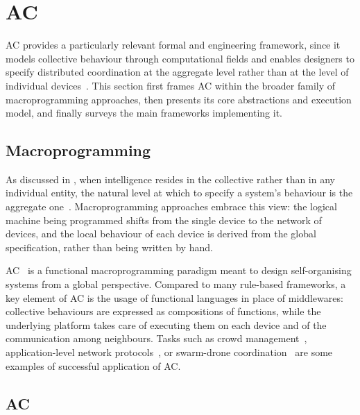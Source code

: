 \section{\acl{AC}}
\label{sec:ac}

\ac{AC} provides a particularly relevant formal and engineering framework,
since it models collective behaviour through computational fields 
and enables designers to specify distributed coordination 
at the aggregate level rather than at the level of individual devices~\cite{viroli2019jlap}.
%
This section first frames \ac{AC} within the broader family of macroprogramming approaches,
then presents its core abstractions and execution model,
and finally surveys the main frameworks implementing it.

\subsection{Macroprogramming}
\label{subsec:macroprogramming}

As discussed in ,
when intelligence resides in the collective rather than in any individual entity,
the natural level at which to specify a system's behaviour is the aggregate one~\cite{DBLP:conf/saso/CasadeiV18}.
%
Macroprogramming approaches embrace this view:
the logical machine being programmed shifts
from the single device to the network of devices,
and the local behaviour of each device is derived from the global specification,
rather than being written by hand.

\ac{AC}~\cite{BealIEEEComputer2015} is a functional macroprogramming paradigm
meant to design self-organising systems from a global perspective.
%
Compared to many rule-based frameworks,
a key element of \ac{AC} is the usage of functional languages in place of middlewares:
collective behaviours are expressed as compositions of functions,
while the underlying platform takes care of executing them on each device
and of the communication among neighbours.
%
Tasks such as crowd management~\cite{BealIEEEComputer2015},
application-level network protocols~\cite{DBLP:conf/acsos/BaiardiPAT25},
or swarm-drone coordination~\cite{DBLP:conf/acsos/GrushchakKPFABS24}
are some examples of successful application of \ac{AC}.

\subsection{\acl{AC}}
\label{subsec:ac-model}

